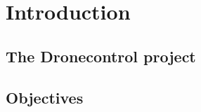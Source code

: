 \cleardoublepage
\chapter{Introduction}
\label{sec:intro}

\section{The Dronecontrol project}




\section{Objectives}
\label{sec:objetives}




